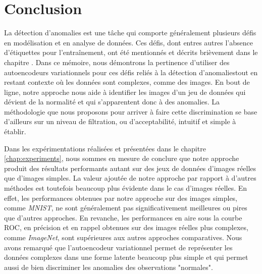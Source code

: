 \chapter*{Conclusion}           %
\label{chap:conclusion}         %

La détection d'anomalies est une tâche qui comporte généralement plusieurs défis en modélisation et en analyse de données. Ces défis, dont entres autres l'absence d'étiquettes pour l'entraînement, ont été mentionnés et décrits brièvement dans le chapitre \DIFaddbegin {}\DIFaddend {}. Dans ce mémoire, nous démontrons la pertinence d'utiliser des autoencodeurs variationnels pour \DIFdelbegin {}\DIFdelend \DIFaddbegin {}\DIFaddend ces défis \DIFdelbegin {}\DIFdelend \DIFaddbegin {}\DIFaddend reliés à la détection d'anomalies\DIFaddbegin \DIFadd{, }\DIFaddend tout en restant \DIFdelbegin {}\DIFdelend \DIFaddbegin {}\DIFaddend contexte où les données sont complexes, comme des images. En bout de ligne, notre approche nous aide à identifier les images d'un jeu de données qui dévient de la normalité et qui s'apparentent donc à des anomalies. La méthodologie que nous proposons pour arriver à faire cette discrimination se base d'ailleurs sur un niveau de filtration, ou d'acceptabilité, intuitif et simple à établir.

Dans les expérimentations réalisées et présentées dans le chapitre \ref{chap:experiments}, nous sommes en mesure de conclure que notre approche produit des résultats performants autant sur des jeux de données d'images réelles que d'images simples. La valeur ajoutée de notre approche par rapport à d'autres méthodes est toutefois beaucoup plus évidente dans le cas d'images réelles. En effet, les performances obtenues par notre approche sur des images simples, comme \textit{MNIST}, ne sont généralement pas significativement meilleures ou pires que d'autres approches. En revanche, les performances en aire sous la courbe ROC, en précision et en rappel obtenues sur des images réelles plus complexes, comme \textit{ImageNet}, sont supérieures aux autres approches comparatives. Nous avons remarqué que l'autoencodeur variationnel permet de représenter les données complexes dans une forme latente beaucoup plus simple et qui permet aussi de bien discriminer les anomalies des observations "normales". 

